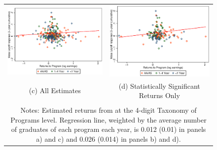\begin{figure}[h]
\begin{tabular}{cc}
\includegraphics[scale=0.5]{./figures/scatter_bycip_all_bytype.eps} &\includegraphics[scale=0.5]{./figures/scatter_bycip_sigret_bytype.eps}\\
(c) All Estimates&(d) Statistically Significant Returns Only\\\\
\multicolumn{2}{p{\textwidth}}{Notes: Estimated returns from \citet{SKG2014} at the 4-digit Taxonomy of Programs level. Regression line, weighted by the average number of graduates of each program each year, is 0.012 (0.01) in panels a) and c) and 0.026 (0.014) in panels b) and d).}\\
\end{tabular}


\label{fig:scatterallsmall}
\end{figure}




